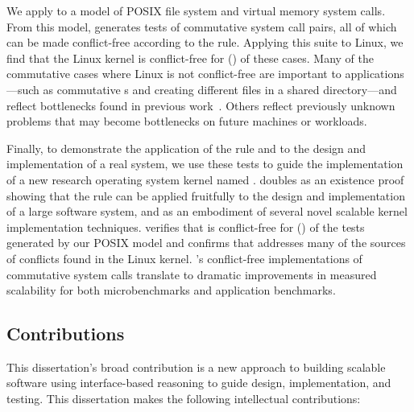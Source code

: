 We apply \tool to a model of
 POSIX file system and virtual memory system
calls.
%
From this model,
\tool generates  tests of commutative
system call pairs, all of which can be made conflict-free
according to the rule.
%
Applying this suite to Linux, we find that the Linux kernel is
conflict-free for 
() of
these cases.
%
Many of the commutative cases where Linux is not conflict-free are
important to applications---such as commutative
s and creating different files in a shared directory---and
reflect bottlenecks found in previous
work~\cite{boyd-wickizer:scaling}.
%
Others reflect previously unknown problems that may become bottlenecks
on future machines or workloads.

Finally, to demonstrate the application of the rule and \tool to the
design and implementation of a real system, we use these tests to
guide the implementation of a new research operating system kernel
named \sys.
%
\sys doubles as an existence proof showing that the rule can be
applied fruitfully to the design and implementation of a large
software system, and as an embodiment of several novel scalable kernel
implementation techniques.
%
%
\tool verifies that \sys is conflict-free for
()
of the tests generated by our POSIX model and confirms that \sys addresses many
of the
sources of conflicts found in the Linux kernel.
%
\sys's conflict-free implementations of
commutative system calls translate to dramatic improvements in
measured scalability for both microbenchmarks and application
benchmarks.


\subsection{Contributions}

This dissertation's broad contribution is a new approach to building
scalable software using interface-based reasoning to guide design,
implementation, and testing.  This dissertation makes the following
intellectual contributions:

